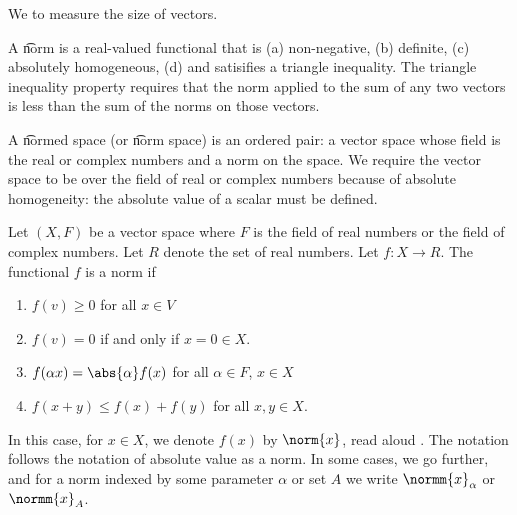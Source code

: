 
We to measure the size of vectors.


A \t{norm} is a real-valued functional that is
(a) non-negative,
(b) definite,
(c) absolutely homogeneous,
(d) and satisifies a triangle inequality.
The triangle inequality property requires that the norm applied to the sum of any two vectors is less than the sum of the norms on those vectors.

A \t{normed space} (or \t{norm space}) is an ordered pair: a vector space whose field is the real or complex numbers and a norm on the space.
We require the vector space to be over the field of real or complex numbers because of absolute homogeneity: the absolute value of a scalar must be defined.


Let $(X, F)$ be a vector space where $F$ is the field of real numbers or the field of complex numbers.
Let $R$ denote the set of real numbers.
Let $f: X \to R$.
The functional $f$ is a norm if
  \begin{enumerate}
  \item $f(v) \geq 0$ for all $x \in V$
  \item $f(v) = 0$ if and only if $x = 0 \in X$.
  \item $f(\alpha x) = \abs{\alpha}f(x)$ for all $\alpha \in F$, $x \in X$
  \item $f(x + y) \leq f(x) + f(y)$ for all $x, y \in X$.
  \end{enumerate}

In this case, for $x \in X$, we denote $f(x)$ by $\norm{x}$, read aloud .
The notation follows the notation of absolute value as a norm.
In some cases, we go further, and for a norm indexed by some parameter $\alpha$ or set $A$ we write $\normm{x}_\alpha$ or $\normm{x}_A$.
